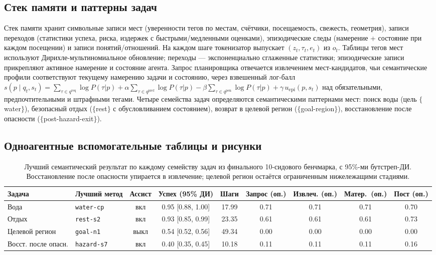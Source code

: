 \documentclass{article}
\newcommand{\method}[1]{\texttt{#1}}
\begin{document}
\subsection{Стек памяти и паттерны задач}

Стек памяти хранит символьные записи мест (уверенности тегов по местам, счётчики, посещаемость, свежесть, геометрия), записи переходов (статистики успеха, риска, издержек с быстрыми/медленными оценками), эпизодические следы (намерение + состояние при каждом посещении) и записи понятий/отношений. На каждом шаге токенизатор выпускает $(z_t, \tau_t, e_t)$ из $o_t$. Таблицы тегов мест используют Дирихле-мультиномиальное обновление; переходы --- экспоненциально сглаженные статистики; эпизодические записи прикрепляют активное намерение и состояние агента. Запрос планировщика отвечается извлечением мест-кандидатов, чьи семантические профили соответствуют текущему намерению задачи и состоянию, через взвешенный лог-балл
$s(p \mid q_t, s_t) = \sum_{\tau \in q^{\mathrm{req}}} \log P(\tau|p)
+ \alpha \sum_{\tau \in q^{\mathrm{pref}}} \log P(\tau|p)
- \beta \sum_{\tau \in q^{\mathrm{pen}}} \log P(\tau|p)
+ \gamma\, u_{\mathrm{epi}}(p, s_t)$
над обязательными, предпочтительными и штрафными тегами. Четыре семейства задач определяются семантическими паттернами мест: поиск воды (цель $\{$water$\}$), безопасный отдых ($\{$rest$\}$ с обусловливанием состоянием), возврат в целевой регион ($\{$goal-region$\}$), восстановление после опасности ($\{$post-hazard-exit$\}$).

\subsection{Одноагентные вспомогательные таблицы и рисунки}
\label{app:single-results-table}

\begin{table}[!ht]
  \caption{Лучший семантический результат по каждому семейству задач из финального 10-сидового бенчмарка, с 95\%-ми бутстреп-ДИ. Восстановление после опасности упирается в извлечение; целевой регион остаётся ограниченным нижележащими стадиями.}
  \label{tab:main-results}
  \centering
  \scriptsize
  \setlength{\tabcolsep}{3.5pt}
  \begin{tabular}{p{1.5cm}p{1.7cm}c c c c c c c}
    \toprule
    Задача & Лучший метод & Ассист & Успех (95\% ДИ) & Шаги & Запрос (оп.) & Извлеч. (оп.) & Матер.\ (оп.) & Пост (оп.) \\
    \midrule
    Вода & \method{water-cp} & вкл & 0.95 [0.88, 1.00] & 17.99 & 0.71 & 0.71 & 0.71 & 0.70 \\
    Отдых & \method{rest-s2} & вкл & 0.93 [0.85, 0.99] & 23.35 & 0.61 & 0.61 & 0.61 & 0.73 \\
    Целевой регион & \method{goal-n1} & выкл & 0.54 [0.52, 0.56] & 49.34 & 0.00 & 0.00 & 0.00 & 0.00 \\
    Восст. после опасн. & \method{hazard-s7} & вкл & 0.40 [0.35, 0.45] & 10.18 & 0.11 & 0.11 & 0.11 & 0.16 \\
    \bottomrule
  \end{tabular}
\end{table}
\end{document}
